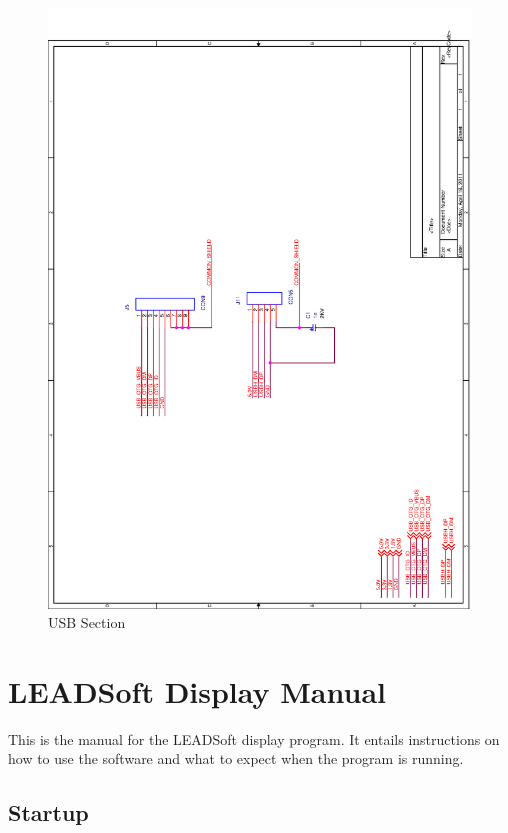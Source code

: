\documentclass[11pt]{report} %
\begin{document}
	\begin{figure}[H]
		\centering
		\includegraphics[scale=0.50]{images/final_usb.png}
		\caption{USB Section}\label{fig:usb_board}
	\end{figure}
	
\chapter{LEADSoft Display Manual}

This is the manual for the LEADSoft display program. It entails instructions on how to use the software
and what to expect when the program is running.

\section {Startup}
\end{document}
